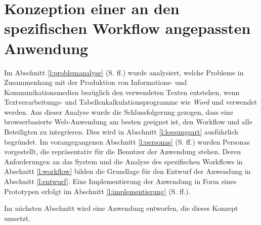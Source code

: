 \section{Konzeption einer an den spezifischen Workflow angepassten Anwendung}\label{l:konzeption}

Im Abschnitt \ref{l:problemanalyse} (S.\pageref{l:problemanalyse} ff.) wurde analysiert, welche Probleme in Zusammenhang mit der Produktion von Informations- und Kommunikationsmedien bezüglich den verwendeten Texten entstehen, wenn Textverarbeitungs- und Tabellenkalkulationsprogramme wie  \emph{Word} und  verwendet werden. Aus dieser Analyse wurde die Schlussfolgerung gezogen, dass eine browserbasierte Web-Anwendung am besten geeignet ist, den Workflow und alle Beteiligten zu integrieren. Dies wird in Abschnitt \ref{l:loesungsart} ausführlich begründet. Im vorangegangenen Abschnitt \ref{l:personas} (S.\pageref{l:personas} ff.) wurden Personas vorgestellt, die repräsentativ für die Benutzer der Anwendung stehen. Deren Anforderungen an das System und die Analyse des spezifischen Workflows in Abschnitt \ref{l:workflow} bilden die Grundlage für den Entwurf der Anwendung in Abschnitt \ref{l:entwurf}. Eine Implementierung der Anwendung in Form eines Prototypen erfolgt im Abschnitt \ref{l:implementierung} (S.\pageref{l:implementierung} ff.).







\bigskip

Im nächsten Abschnitt wird eine Anwendung entworfen, die dieses Konzept umsetzt.

\pagebreak